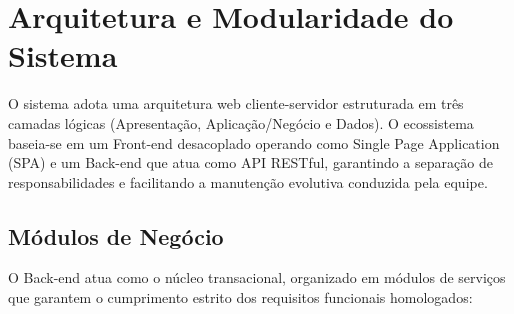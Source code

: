 \documentclass[
	12pt,				%
	openany,			%
	oneside,			%
	a4paper,			%
	english,			%
	french,				%
	spanish,			%
	brazil				%
	]{abntex2}
\begin{document}
\section{Arquitetura e Modularidade do Sistema}

O sistema adota uma arquitetura web cliente-servidor estruturada em três camadas lógicas (Apresentação, Aplicação/Negócio e Dados). O ecossistema baseia-se em um Front-end desacoplado operando como Single Page Application (SPA) e um Back-end que atua como API RESTful, garantindo a separação de responsabilidades e facilitando a manutenção evolutiva conduzida pela equipe.

\subsection{Módulos de Negócio}

O Back-end atua como o núcleo transacional, organizado em módulos de serviços que garantem o cumprimento estrito dos requisitos funcionais homologados:
\end{document}
